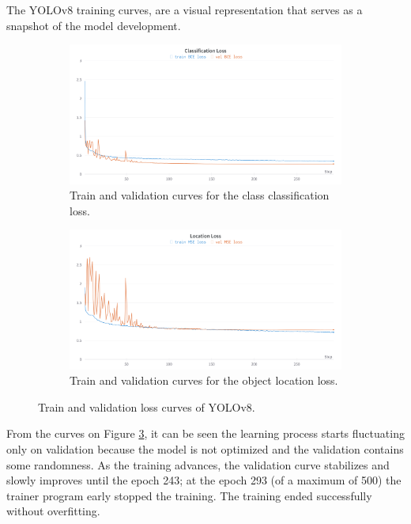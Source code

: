 
{
    The YOLOv8 training curves, are a visual representation that serves as a snapshot of the model development.
}

\begin{figure}[!p]
	\centering
	\begin{subfigure}[b]{\textwidth}
		\includegraphics[width=\textwidth]{figures/06_results/ClassLossDetector.png}
		\caption{\footnotesize{Train and validation curves for the class classification loss.}}
		\label{fig:detector_class_loss}
	\end{subfigure}
	\begin{subfigure}[b]{\textwidth}
		\includegraphics[width=\textwidth]{figures/06_results/LocationLossDetector.png}
		\caption{\footnotesize{Train and validation curves for the object location loss.}}
		\label{fig:detector_location_loss}
	\end{subfigure}
	
	\caption[Train and validation loss curves of YOLOv8]{\footnotesize{Train and validation loss curves of YOLOv8.}}
	\label{fig:yolov8 train curves}
\end{figure}

{
    From the curves on Figure \ref{fig:yolov8 train curves}, it can be seen the learning process starts fluctuating only on validation because the model is not optimized and the validation contains some randomness. 
	As the training advances, the validation curve stabilizes and slowly improves until the epoch 243; at the epoch 293 (of a maximum of 500) the trainer program early stopped the training. 
    The training ended successfully without overfitting.
}

